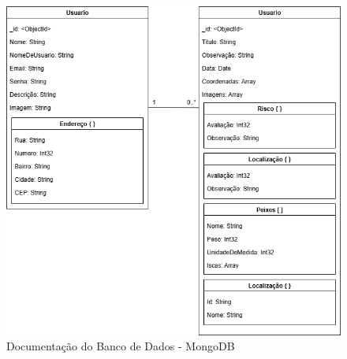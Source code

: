 \begin{figure}[H]
    \centering
    \caption{Documentação do Banco de Dados - MongoDB}
    \label{fig:documentacaoBancoDeDados}
    \includegraphics[scale=0.65]{./dados/figuras/documentacao-banco-de-dados.png}
\end{figure}
